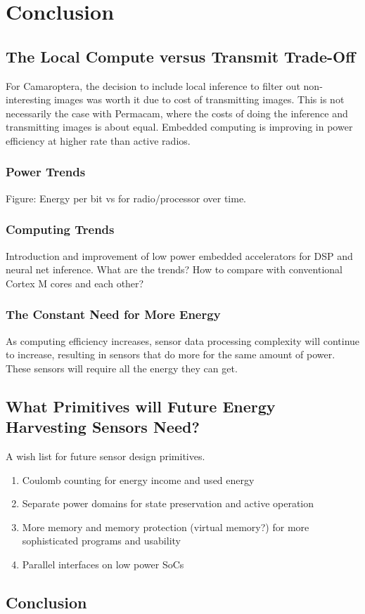 \chapter{Conclusion}
\label{chap:conc}

\section{The Local Compute versus Transmit Trade-Off}

For Camaroptera, the decision to include local inference to filter out non-interesting images was worth it due to cost of transmitting images. This is not necessarily the case with Permacam, where the costs of doing the inference and transmitting images is about equal.
Embedded computing is improving in power efficiency at higher rate than active radios.


\subsection{Power Trends}

Figure: Energy per bit vs \ssi[per-mode=symbol]{\micro\ampere\per\mega\hertz} for radio/processor over time.

\subsection{Computing Trends}
Introduction and improvement of low power embedded accelerators for DSP and neural net inference. What are the trends? How to compare with conventional Cortex M cores and each other?

\subsection{The Constant Need for More Energy}
As computing efficiency increases, sensor data processing complexity will continue to increase, resulting in sensors that do more for the same amount of power. These sensors will require all the energy they can get. 

\section{What Primitives will Future Energy Harvesting Sensors Need?}

A wish list for future sensor design primitives.

\begin{enumerate}
    \item Coulomb counting for energy income and used energy
    \item Separate power domains for state preservation and active operation
    \item More memory and memory protection (virtual memory?) for more sophisticated programs and usability
    \item Parallel interfaces on low power SoCs
\end{enumerate}

\section{Conclusion}